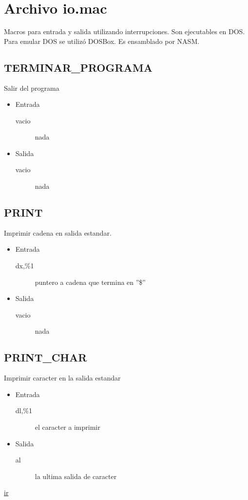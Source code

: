 \section{Archivo io.mac}
\label{sec-1}
Macros para entrada y salida utilizando interrupciones. Son
ejecutables en DOS. Para emular DOS se utilizó DOSBox. Es ensamblado
por NASM.
  
\subsection{TERMINAR\_PROGRAMA}
\label{sec-1-1}
Salir del programa
\begin{itemize}
\item Entrada
\begin{description}
\item[vacio] nada
\end{description}
\item Salida
\begin{description}
\item[vacio] nada
\end{description}
\end{itemize}

\subsection{PRINT}
\label{sec-1-2}
Imprimir cadena en salida estandar.
\begin{itemize}
\item Entrada
\begin{description}
\item[dx,\%1] puntero a cadena que termina en ''\$''
\end{description}
\item Salida
\begin{description}
\item[vacio] nada
\end{description}
\end{itemize}

\subsection{PRINT\_CHAR}
\label{sec-1-3}
Imprimir caracter en la salida estandar
\begin{itemize}
\item Entrada
\begin{description}
\item[dl,\%1] el caracter a imprimir
\end{description}
\item Salida
\begin{description}
\item[al] la ultima salida de caracter
\end{description}
\end{itemize}
\href{http://www.ctyme.com/intr/rb-2554.htm}{ir}

